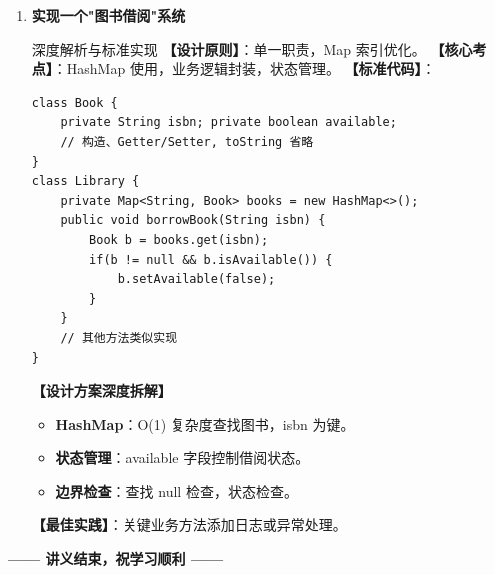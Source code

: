 \documentclass[12pt, a4paper]{ctexart}
\begin{document}
\begin{enumerate}[label=\textbf{\arabic*.}, itemsep=1em]
    \item \textbf{实现一个"图书借阅"系统}
    \begin{bluebox}{深度解析与标准实现}
    \textbf{【设计原则】}：单一职责，Map 索引优化。
    \textbf{【核心考点】}：HashMap 使用，业务逻辑封装，状态管理。
    \textbf{【标准代码】}：
    \begin{lstlisting}[style=JavaExam]
class Book {
    private String isbn; private boolean available;
    // 构造、Getter/Setter, toString 省略
}
class Library {
    private Map<String, Book> books = new HashMap<>();
    public void borrowBook(String isbn) {
        Book b = books.get(isbn);
        if(b != null && b.isAvailable()) {
            b.setAvailable(false);
        }
    }
    // 其他方法类似实现
}
    \end{lstlisting}
    \textbf{【设计方案深度拆解】}
    \begin{itemize}[leftmargin=*, nosep]
        \item \textbf{HashMap}：O(1) 复杂度查找图书，isbn 为键。
        \item \textbf{状态管理}：available 字段控制借阅状态。
        \item \textbf{边界检查}：查找 null 检查，状态检查。
    \end{itemize}
    \textbf{【最佳实践】}：关键业务方法添加日志或异常处理。
    \end{bluebox}
\end{enumerate}

\vfill
\begin{center}
\bfseries —— 讲义结束，祝学习顺利 ——
\end{center}
\end{document}
